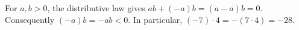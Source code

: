 For $a,b>0$, the distributive law gives $ab+(-a)b=(a-a)b=0$. Consequently $(-a)b=-ab<0$. In particular, $(-7)\cdot4=-(7\cdot4)=\boxed{-28}$.
